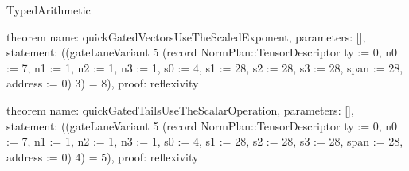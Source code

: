 \begin{lexlean}{TypedArithmetic}
\begin{semanticmodule}
theorem{
  name: quickGatedVectorsUseTheScaledExponent,
  parameters: [],
  statement: ((gateLaneVariant 5 (record NormPlan::TensorDescriptor {ty := 0, n0 := 7, n1 := 1, n2 := 1, n3 := 1, s0 := 4, s1 := 28, s2 := 28, s3 := 28, span := 28, address := 0}) 3) = 8),
  proof: reflexivity{}
}

theorem{
  name: quickGatedTailsUseTheScalarOperation,
  parameters: [],
  statement: ((gateLaneVariant 5 (record NormPlan::TensorDescriptor {ty := 0, n0 := 7, n1 := 1, n2 := 1, n3 := 1, s0 := 4, s1 := 28, s2 := 28, s3 := 28, span := 28, address := 0}) 4) = 5),
  proof: reflexivity{}
}

\end{semanticmodule}
\end{lexlean}
